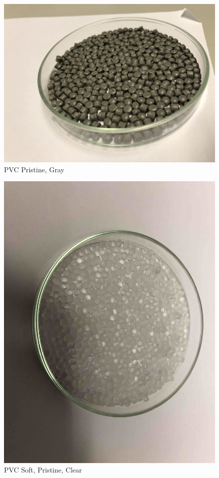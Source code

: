 \begin{appendices}
\begin{figure}
    \centering
    \includegraphics[width = 12cm]{Images/appendix/PVC-pristine.jpg}
    \caption[$\; \:$PVC Pristine]{PVC Pristine, Gray}
    \label{fig:pvc-gray}
\end{figure}

\begin{figure}
    \centering
    \includegraphics[width = 12cm]{Images/appendix/PVC-pristine-soft.jpg}
    \caption[$\; \:$PVC Soft]{PVC Soft, Pristine, Clear}
    \label{fig:pvc-clear}
\end{figure}


\end{appendices}
